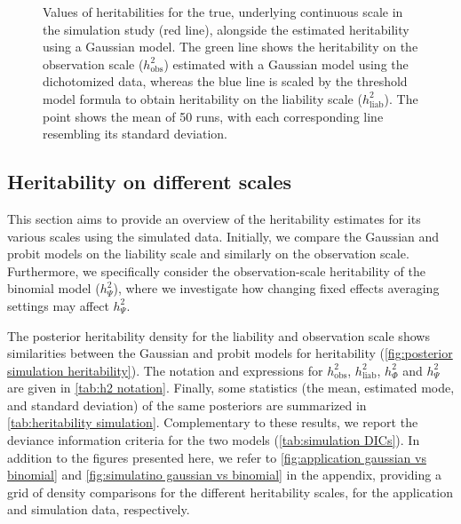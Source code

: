 \begin{figure}
\begin{subfigure}[b]{0.49\textwidth}
  \end{subfigure}
  \caption[Estimated heritability compared to the true value in simulation]{Values of heritabilities for the true, underlying continuous scale in the simulation study (red line), alongside the estimated heritability using a Gaussian model. The green line shows the heritability on the observation scale ($h^2_\text{obs}$) estimated with a Gaussian model using the dichotomized data, whereas the blue line is scaled by the threshold model formula to obtain heritability on the liability scale ($h^2_\text{liab}$). The point shows the mean of 50 runs, with each corresponding line resembling its standard deviation.}
  \label{fig:simulation_h2_dev}
\end{figure}

\subsection{Heritability on different scales}

This section aims to provide an overview of the heritability estimates for its various scales using the simulated data. Initially, we compare the Gaussian and probit models on the liability scale and similarly on the observation scale. Furthermore, we specifically consider the observation-scale heritability of the binomial model ($h^2_\Psi$), where we investigate how changing fixed effects averaging settings may affect $h^2_\Psi$.

The posterior heritability density for the liability and observation scale shows similarities between the Gaussian and probit models for heritability (\autoref{fig:posterior simulation heritability}). The notation and expressions for $h^2_\text{obs}$, $h^2_\text{liab}$, $h^2_\Phi$ and $h^2_\Psi$ are given in \autoref{tab:h2 notation}.
Finally, some statistics (the mean, estimated mode, and standard deviation) of the same posteriors are summarized in \autoref{tab:heritability simulation}. Complementary to these results, we report the deviance information criteria for the two models (\autoref{tab:simulation DICs}). In addition to the figures presented here, we refer to \autoref{fig:application gaussian vs binomial} and \autoref{fig:simulatino gaussian vs binomial} in the appendix, providing a grid of density comparisons for the different heritability scales, for the application and simulation data, respectively.

